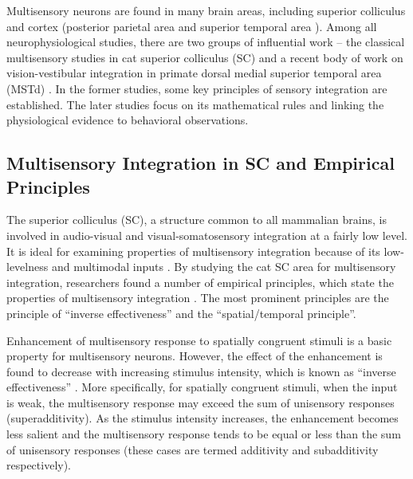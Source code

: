 \documentclass{article}[11pt]
\begin{document}

Multisensory neurons are found in many brain areas, including superior colliculus \cite{stein_merging_1993} and cortex (posterior parietal area \cite{graziano_system_2001} and superior temporal area \cite{alais_multisensory_2010}).
Among all neurophysiological studies, there are two groups of influential work -- the classical multisensory studies in cat superior colliculus (SC) \cite{stein_merging_1993, stein_multisensory_2008} and a recent body of work on vision-vestibular integration in primate dorsal medial superior temporal area (MSTd) \cite{morgan_multisensory_2008, fetsch_visualvestibular_2010}.
In the former studies, some key principles of sensory integration are established. The later studies focus on its mathematical rules and linking the physiological evidence to behavioral observations.


\subsection{Multisensory Integration in SC and Empirical Principles}
The superior colliculus (SC), a structure common to all mammalian brains, is involved in audio-visual and visual-somatosensory integration at a fairly low level. It is ideal for examining properties of multisensory integration because of its low-levelness and multimodal inputs \cite{alais_multisensory_2010}.
By studying the cat SC area for multisensory integration, researchers found a number of empirical principles, which state the properties of multisensory integration \cite{stein_merging_1993}. The most prominent principles are the principle of ``inverse effectiveness'' and the ``spatial/temporal principle''.

Enhancement of multisensory response to spatially congruent stimuli is a basic property for multisensory neurons. However, the effect of the enhancement is found to decrease with increasing stimulus intensity, which is known as ``inverse effectiveness'' \cite{meredith_visual_1986}. More specifically, for spatially congruent stimuli, when the input is weak, the multisensory response may exceed the sum of unisensory responses (superadditivity). As the stimulus intensity increases, the enhancement becomes less salient and the multisensory response tends to be equal or less than the sum of unisensory responses (these cases are termed additivity and subadditivity respectively).
\end{document}
